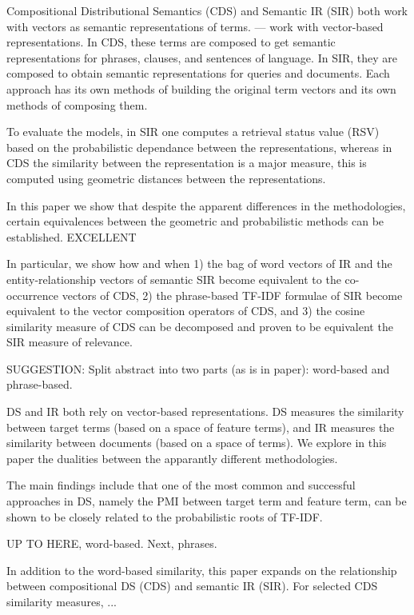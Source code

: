 Compositional Distributional Semantics (CDS) and Semantic IR (SIR)
both work with vectors as semantic representations of terms.
--- work with vector-based representations.
%
In CDS, these terms are composed to get semantic representations for phrases, clauses, and sentences of language.
In SIR, they are composed to obtain semantic representations for queries and documents.
Each approach has its own methods of building the original term vectors and its own methods of composing them. 

To evaluate the models, in SIR one computes a retrieval status value (RSV) based on the probabilistic dependance between the representations, whereas in CDS the similarity between the representation is a major measure, this is computed using geometric distances between the representations.

In this paper we show that despite the apparent differences
in the methodologies,
certain equivalences
between the geometric and probabilistic methods can be established. 
EXCELLENT

In particular, we show how and when 1) the bag of word vectors of IR and the entity-relationship vectors of semantic SIR become equivalent to the co-occurrence vectors of CDS, 2) the phrase-based TF-IDF formulae of SIR become equivalent to the vector composition operators of CDS, and 3) the cosine similarity measure of CDS can be decomposed and proven to be equivalent the SIR measure of relevance. 


\hrulefill

SUGGESTION: Split abstract into two parts (as is in paper):
word-based and phrase-based.

DS and IR both rely on vector-based representations.
%
DS measures the similarity between target terms
(based on a space of feature terms), and IR
measures the similarity between documents
(based on a space of terms).
%
We explore in this paper the dualities between the apparantly different
methodologies.

The main findings include that one of the most common and successful
approaches in DS,
namely the PMI between target term and feature term, can be shown to be
closely related to the probabilistic roots of TF-IDF.

UP TO HERE, word-based. Next, phrases.

\hrulefill

In addition to the word-based similarity, this paper expands on the relationship
between compositional DS (CDS) and semantic IR (SIR).
%
For selected CDS similarity measures, ...

